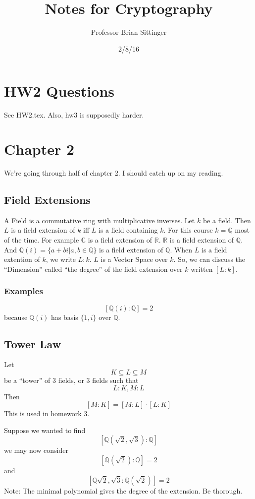 \documentclass{article}
\title{Notes for Cryptography}
\author{Professor Brian Sittinger}
\date{2/8/16}
\begin{document}
\maketitle
\section{HW2 Questions}

See HW2.tex. Also, hw3 is supposedly harder.

\section{Chapter 2}
We're going through half of chapter 2. I should catch up on my reading. 
\subsection{Field Extensions}
A Field is a commutative ring with multiplicative inverses. Let $k$ be a field.
Then $L$ is a field extension of $k$ iff $L$ is a field containing $k$. For this
course $k = \mathbb{Q}$ most of the time. For example $\mathbb{C}$ is a field
extension of $\mathbb{R}$. $\mathbb{R}$ is a field extension of $\mathbb{Q}$.
And $\mathbb{Q}(i) = \{ a + bi | a,b \in \mathbb{Q} \}$ is a field extension of
$\mathbb{Q}$. When $L$ is a field extention of $k$, we write $L:k$. $L$ is a
Vector Space over $k$. So, we can discuss the ``Dimension'' called ``the
degree'' of the field extension over $k$ written $[L:k]$. 
\subsubsection{Examples}
\[ [\mathbb{Q}(i) : \mathbb{Q}] = 2 \]
because $\mathbb{Q}(i)$ has basis $\{1,i\}$ over $\mathbb{Q}$. 

\subsection{Tower Law}
Let 
\[ K \subseteq L \subseteq M \]
be a ``tower'' of 3 fields, or 3 fields such that
\[ L : K, M : L \]
Then
\[ [ M : K ] = [ M : L] \cdot [ L : K ] \]
This is used in homework 3. 

Suppose we wanted to find
\[ [ \mathbb{Q}(\sqrt{2}, \sqrt{3}) : \mathbb{Q} ] \]
we may now consider
\[ [ \mathbb{Q}(\sqrt{2}) : \mathbb{Q}] = 2\]
and \[ [ \mathbb{Q}\sqrt{2},\sqrt{3} : \mathbb{Q}(\sqrt{2}) ] = 2\]
Note: The minimal polynomial gives the degree of the extension. Be thorough. 
\end{document}
